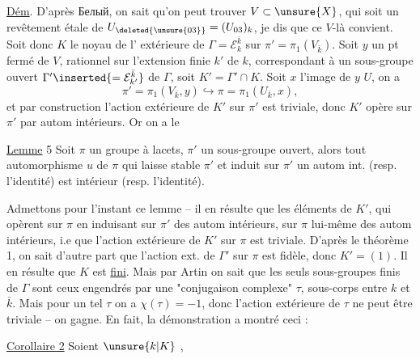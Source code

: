 

\uline{Dém}. D'après Белый, on sait qu'on peut trouver $V\subset\unsure{X}$, qui soit un revêtement étale de $U_{\deleted{\unsure{03}}}=(U_{03})_k$, je dis que ce $V$-là convient. Soit donc $K$ le noyau de l' extérieure de $\Gamma=\mathcal E_k^{\bar k}$ sur $\pi'=\pi_1(V_{\bar k})$. Soit $y$ un pt fermé de $V$, rationnel sur l'extension finie $k'$ de $k$, correspondant à un sous-groupe ouvert $\Gamma'\inserted{=\mathcal E_{k'}^{\bar k}}$ de $\Gamma$, soit $K'=\Gamma'\cap K$. Soit $x$ l'image de $y$  $U$, on a
\[
\pi'=\pi_1(V_{\bar k},y)\hookrightarrow\pi=\pi_1(U_{\bar k},x),
\]
et par construction l'action extérieure de $K'$ sur $\pi'$ est triviale, donc $K'$ opère sur $\pi'$ par autom intérieurs. Or on a le

\uline{Lemme} 5 Soit $\pi$ un groupe  à lacets, $\pi'$ un sous-groupe ouvert, alors tout automorphisme $u$ de $\pi$ qui laisse stable $\pi'$ et induit sur $\pi'$ un autom int. (resp. l'identité) est intérieur (resp. l'identité).



Admettons pour l'instant ce lemme -- il en résulte que les éléments de $K'$, qui opèrent sur $\pi$ en induisant sur $\pi'$ des autom intérieurs,  sur $\pi$ lui-même des autom intérieurs, i.e que l'action extérieure de $K'$ sur $\pi$ est triviale. D'après le théorème 1, on sait d'autre part que l'action ext. de $\Gamma'$ sur $\pi$ est fidèle, donc $K'=(1)$. Il en résulte que $K$ est \uline{fini}. Mais par Artin on sait que les seuls sous-groupes finis  de $\Gamma$ sont ceux engendrés par une "conjugaison  complexe" $\tau$,   sous-corps   entre $k$ et $\bar k$. Mais pour un tel $\tau$ on a $\chi(\tau)=-1$, donc l'action extérieure de $\tau$ ne peut être triviale -- on gagne. En fait, la démonstration a montré ceci :

\uline{Corollaire 2} Soient $\unsure{k|K}$  ,


